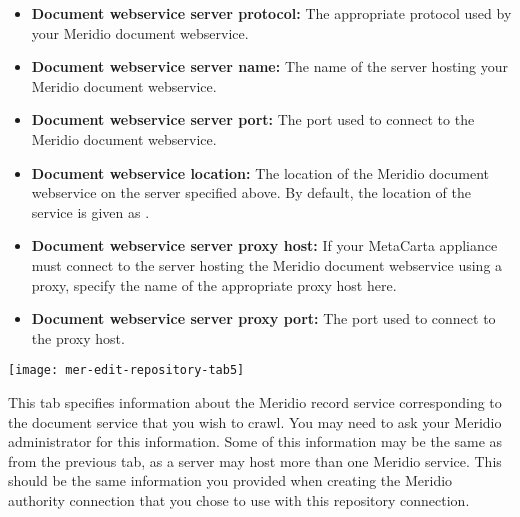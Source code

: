 \begin{itemize}

\item \textbf{Document webservice server protocol:} The appropriate protocol used by your Meridio document webservice.

\item \textbf{Document webservice server name:} The name of the server hosting your Meridio document webservice.

\item \textbf{Document webservice server port:} The port used to connect to the Meridio document webservice.

\item \textbf{Document webservice location:} The location of the Meridio document webservice on the server specified above. By default, the location of the service is given as .

\item \textbf{Document webservice server proxy host:} If your MetaCarta appliance must connect to the server hosting the Meridio document webservice using a proxy, specify the name of the appropriate proxy host here.

\item \textbf{Document webservice server proxy port:} The port used to connect to the proxy host.

\end{itemize}

\texttt{[image: mer-edit-repository-tab5]}

This tab specifies information about the Meridio record service
corresponding to the document service that you wish to crawl. You may
need to ask your Meridio administrator for this information. Some of
this information may be the same as from the previous tab, as a server
may host more than one Meridio service.  This should be the same
information you provided when creating the Meridio authority
connection that you chose to use with this repository connection.

